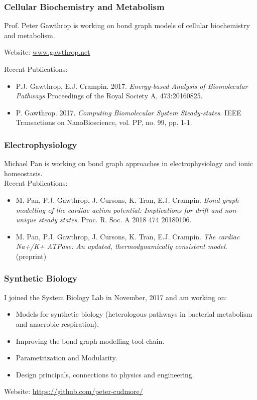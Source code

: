 \documentclass[12pt,reqno]{beamer}
\begin{document}
\begin{frame}
\frametitle{Cellular Biochemistry and Metabolism}

Prof. Peter Gawthrop is working on bond graph models of cellular biochemistry and metabolism.\\
\vspace{10pt}

Website: \url{www.gawthrop.net}
\vspace{10pt}

Recent Publications:
\begin{itemize}
	\itemsep1em
	\item  P.J. Gawthrop, E.J. Crampin. 2017. \emph{Energy-based Analysis of Biomolecular Pathways}
	Proceedings of the Royal Society A, 473:20160825.
	\item P. Gawthrop. 2017. \emph{Computing Biomolecular System Steady-states.}
	 IEEE Transactions on NanoBioscience, vol. PP, no. 99, pp. 1-1. 
\end{itemize}


\end{frame}
\begin{frame}
\frametitle{Electrophysiology}
Michael Pan is working on bond graph approaches in electrophysiology and ionic homeostasis. \\
\vspace{10pt}
Recent Publications:
\begin{itemize}
	\itemsep1em
	\item M. Pan, P.J. Gawthrop, J. Cursons, K. Tran, E.J. Crampin. \emph{Bond graph modelling of the cardiac action potential: Implications for drift and non-unique steady states}.
	Proc. R. Soc. A 2018 474 20180106.
	\item M. Pan, P.J. Gawthrop, J. Cursons, K. Tran, E.J. Crampin.
	\emph{The cardiac Na+/K+ ATPase: An updated, thermodynamically consistent model}. (preprint)
\end{itemize}
\end{frame}
\begin{frame}
\frametitle{Synthetic Biology}
I joined the System Biology Lab in November, 2017 and am working on:
\\

\begin{itemize}
	\item Models for synthetic biology (heterologous pathways in bacterial metabolism and anaerobic respiration).
	\item Improving the bond graph modelling tool-chain. 
	\item Parametrization and Modularity.
    \item Design principals, connections to physics and engineering.
\end{itemize}
\vspace{10pt}

Website: \url{https://github.com/peter-cudmore/}

\end{frame}
\end{document}
